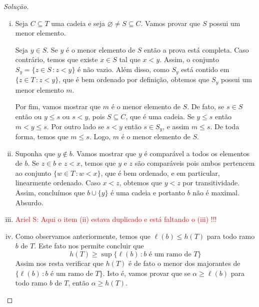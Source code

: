 \documentclass[a4paper]{article}
\theoremstyle{plain}\newtheorem{teo}{Teorema}[section]
\begin{document}
  \begin{proof}[Solução]\hfill
    \begin{enumerate}[(i)]
      \item  Seja \(C\subseteq T\) uma cadeia e seja
        \(\varnothing\not = S\subseteq C\). Vamos provar que \(S\) possui um menor
        elemento.

        Seja \(y\in S\). Se \(y\) é o menor elemento de \(S\) então a prova está
        completa. Caso contrário, temos que existe \(x\in S\) tal que \(x<y\). Assim,
         o conjunto \(S_{y} =\{z\in S\,\colon z<y\}\) é não vazio. Além disso, como
         \(S_y\) está contido em \(\{z\in T\,\colon z<y\}\), que é bem ordenado por
         definição, obtemos que \(S_y\) possui um menor elemento \(m\).

         Por fim, vamos mostrar que \(m\) é o menor elemento de \(S\). De fato, se
         \(s\in S\) então ou \(y \leq s\) ou \(s<y\), pois \(S\subseteq C\), que é uma cadeia.
         Se \(y \leq s\) então \(m<y\leq s\). Por outro lado se
         \(s<y\) então \(s\in S_{y}\), e assim \(m\leq s\). De toda forma, temos que
         \(m\leq s\). Logo,  \(m\) é o menor elemento de \(S\).

       \item Suponha que \(y\not\in b\). Vamos mostrar que \(y\) é comparável
        a todos os elementos de \(b\). Se \(z\in b\) e \(z < x\), temos que
        \(y\) e \(z\) são comparáveis pois ambos pertencem ao conjunto \(\{w\in
        T\,\colon w< x \}\), que é bem ordenado, e em particular, linearmente
        ordenado. Caso \(x<z\), obtemos que \(y<z\) por transitividade. Assim,
        concluímos que \(b\cup\{y\}\) é uma cadeia e portanto \(b\) não é
        maximal. Absurdo.

        \item \textcolor{red}{Ariel S: Aqui o item (ii) estava duplicado e está
            faltando o (iii) !!!}
        
      \item Como observamos anteriormente, temos que  \(\ell (b)\leq h(T)\) para
        todo ramo \(b\) de \(T\). Este fato nos permite concluir que
        \[h(T)\geq\sup\{\ell(b)\,\colon b \text{ é um ramo de } T\}\]
        Assim nos resta verificar que \(h(T)\) é de fato o menor dos majorantes
         de \(\{\ell(b)\,\colon b \text{ é um ramo de } T\}\). Isto é, vamos
         provar que se \(\alpha\geq  \ell (b)\)
        para todo ramo \(b\) de \(T\), então \(\alpha\geq h(T)\).


\end{enumerate}
\end{proof}
\end{document}
